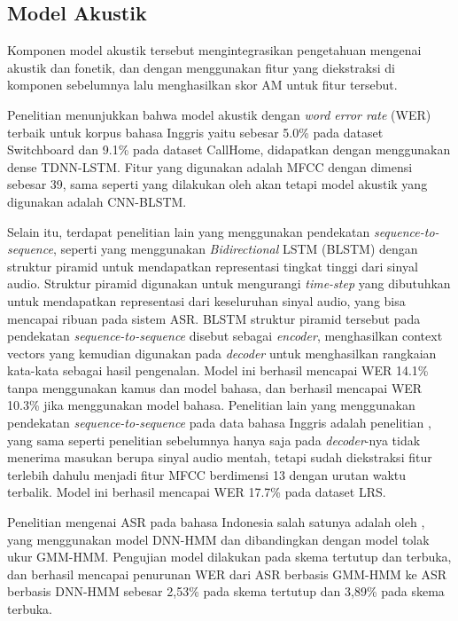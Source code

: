 \subsection{Model Akustik}

Komponen model akustik tersebut mengintegrasikan pengetahuan mengenai akustik dan fonetik, dan dengan menggunakan fitur yang diekstraksi di komponen sebelumnya lalu menghasilkan skor AM untuk fitur tersebut.
\bigskip

Penelitian \textcite{Han2018} menunjukkan bahwa model akustik dengan \textit{word error rate} (WER) terbaik untuk korpus bahasa Inggris yaitu sebesar 5.0\% pada dataset Switchboard dan 9.1\% pada dataset CallHome, didapatkan dengan menggunakan dense TDNN-LSTM. Fitur yang digunakan adalah MFCC dengan dimensi sebesar 39, sama seperti yang dilakukan oleh \textcite{Xiong2017} akan tetapi model akustik yang digunakan adalah CNN-BLSTM.
\bigskip

Selain itu, terdapat penelitian lain yang menggunakan pendekatan \textit{sequence-to-sequence}, seperti \textcite{Chan2015} yang menggunakan \textit{Bidirectional} LSTM (BLSTM) dengan struktur piramid untuk mendapatkan representasi tingkat tinggi dari sinyal audio. Struktur piramid digunakan untuk mengurangi \textit{time-step} yang dibutuhkan untuk mendapatkan representasi dari keseluruhan sinyal audio, yang bisa mencapai ribuan pada sistem ASR. BLSTM struktur piramid tersebut pada pendekatan \textit{sequence-to-sequence} disebut sebagai \textit{encoder}, menghasilkan context vectors yang kemudian digunakan pada \textit{decoder} untuk menghasilkan rangkaian kata-kata sebagai hasil pengenalan. Model ini berhasil mencapai WER 14.1\% tanpa menggunakan kamus dan model bahasa, dan berhasil mencapai WER 10.3\% jika menggunakan model bahasa. Penelitian lain yang menggunakan pendekatan \textit{sequence-to-sequence} pada data bahasa Inggris adalah penelitian \textcite{Chung2017}, yang sama seperti penelitian sebelumnya hanya saja pada \textit{decoder}-nya tidak menerima masukan berupa sinyal audio mentah, tetapi sudah diekstraksi fitur terlebih dahulu menjadi fitur MFCC berdimensi 13 dengan urutan waktu terbalik. Model ini berhasil mencapai WER 17.7\% pada dataset LRS.
\bigskip

Penelitian mengenai ASR pada bahasa Indonesia salah satunya adalah oleh \textcite{Yuwan2018}, yang menggunakan model DNN-HMM dan dibandingkan dengan model tolak ukur GMM-HMM. Pengujian model dilakukan pada skema tertutup dan terbuka, dan berhasil mencapai penurunan WER dari ASR berbasis GMM-HMM ke ASR berbasis DNN-HMM sebesar 2,53\% pada skema tertutup dan 3,89\% pada skema terbuka.


